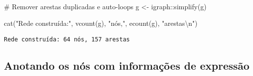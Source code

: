 \documentclass[
  letterpaper,
  DIV=11,
  numbers=noendperiod]{scrreprt}
\newenvironment{Shaded}{\begin{snugshade}}{\end{snugshade}}
\newcommand{\CommentTok}[1]{\textcolor[rgb]{0.37,0.37,0.37}{#1}}
\newcommand{\FunctionTok}[1]{\textcolor[rgb]{0.28,0.35,0.67}{#1}}
\newcommand{\NormalTok}[1]{\textcolor[rgb]{0.00,0.23,0.31}{#1}}
\newcommand{\OtherTok}[1]{\textcolor[rgb]{0.00,0.23,0.31}{#1}}
\newcommand{\SpecialCharTok}[1]{\textcolor[rgb]{0.37,0.37,0.37}{#1}}
\newcommand{\StringTok}[1]{\textcolor[rgb]{0.13,0.47,0.30}{#1}}
\begin{document}
\begin{Shaded}
\begin{Highlighting}[]
\CommentTok{\# Remover arestas duplicadas e auto{-}loops}
\NormalTok{g }\OtherTok{\textless{}{-}}\NormalTok{ igraph}\SpecialCharTok{::}\FunctionTok{simplify}\NormalTok{(g)}

\FunctionTok{cat}\NormalTok{(}\StringTok{"Rede construída:"}\NormalTok{, }\FunctionTok{vcount}\NormalTok{(g), }\StringTok{"nós,"}\NormalTok{, }\FunctionTok{ecount}\NormalTok{(g), }\StringTok{"arestas}\SpecialCharTok{\textbackslash{}n}\StringTok{"}\NormalTok{)}
\end{Highlighting}
\end{Shaded}

\begin{verbatim}
Rede construída: 64 nós, 157 arestas
\end{verbatim}

\subsection{Anotando os nós com informações de
expressão}\label{anotando-os-nuxf3s-com-informauxe7uxf5es-de-expressuxe3o}
\end{document}
